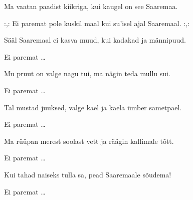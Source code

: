 Ma vaatan paadist kiikriga,
kui kaugel on see Saaremaa.

:,: Ei paremat pole kuskil maal
kui su'isel ajal Saaremaal. :,:

S\"a\"al Saaremaal ei kasva muud,
kui kadakad ja m\"annipuud.

Ei paremat \ldots

Mu pruut on valge nagu tui,
ma n\"agin teda mullu sui.

Ei paremat \ldots

Tal mustad juuksed, valge kael
ja kaela \"umber sametpael.

Ei paremat \ldots

Ma r\"u\"upan merest soolast vett
ja r\"a\"agin kallimale t\~ott.

Ei paremat \ldots

Kui tahad naiseks tulla sa,
pead Saaremaale s\~oudema!

Ei paremat \ldots